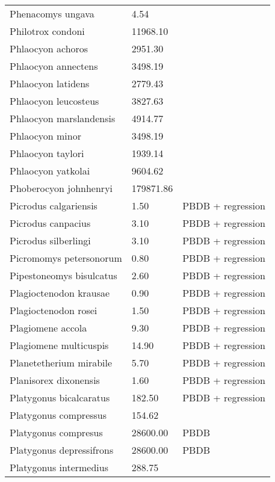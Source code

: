 \begin{longtable}{p{} p{} p{}}
    Phenacomys ungava & 4.54 & \cite{Smith2004} \\ 
    Philotrox condoni & 11968.10 & \cite{Tomiya2013} \\ 
    Phlaocyon achoros & 2951.30 & \cite{Tomiya2013} \\ 
    Phlaocyon annectens & 3498.19 & \cite{Tomiya2013} \\ 
    Phlaocyon latidens & 2779.43 & \cite{Tomiya2013} \\ 
    Phlaocyon leucosteus & 3827.63 & \cite{Tomiya2013} \\ 
    Phlaocyon marslandensis & 4914.77 & \cite{Tomiya2013} \\ 
    Phlaocyon minor & 3498.19 & \cite{Tomiya2013} \\ 
    Phlaocyon taylori & 1939.14 & \cite{Tomiya2013} \\ 
    Phlaocyon yatkolai & 9604.62 & \cite{Tomiya2013} \\ 
    Phoberocyon johnhenryi & 179871.86 & \cite{Tomiya2013} \\ 
    Picrodus calgariensis & 1.50 & PBDB + regression \\ 
    Picrodus canpacius & 3.10 & PBDB + regression \\ 
    Picrodus silberlingi & 3.10 & PBDB + regression \\ 
    Picromomys petersonorum & 0.80 & PBDB + regression \\ 
    Pipestoneomys bisulcatus & 2.60 & PBDB + regression \\ 
    Plagioctenodon krausae & 0.90 & PBDB + regression \\ 
    Plagioctenodon rosei & 1.50 & PBDB + regression \\ 
    Plagiomene accola & 9.30 & PBDB + regression \\ 
    Plagiomene multicuspis & 14.90 & PBDB + regression \\ 
    Planetetherium mirabile & 5.70 & PBDB + regression \\ 
    Planisorex dixonensis & 1.60 & PBDB + regression \\ 
    Platygonus bicalcaratus & 182.50 & PBDB + regression \\ 
    Platygonus compressus & 154.62 & \cite{Smith2004} \\ 
    Platygonus compresus & 28600.00 & PBDB \\ 
    Platygonus depressifrons & 28600.00 & PBDB \\ 
    Platygonus intermedius & 288.75 & \cite{Rose1982a} \\ 

\end{longtable}
